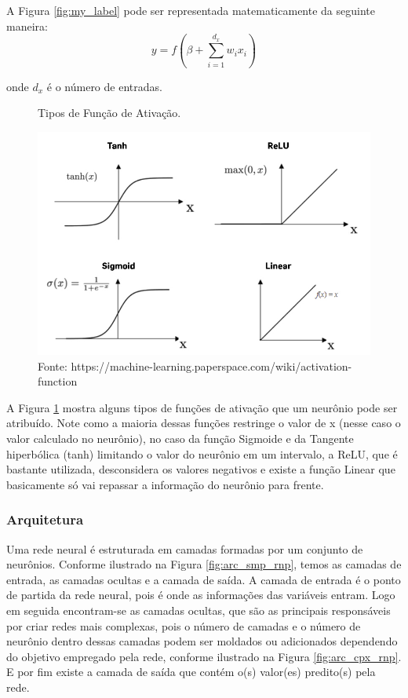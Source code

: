 A Figura \ref{fig:my_label} pode ser representada matematicamente da seguinte maneira:
\begin{equation}
    y = f (\beta + \sum_{i=1}^{d_x} w_ix_{i} ) 
    \label{neuronio}
\end{equation}
 
 onde $d_x$ é o número de entradas.


\begin{figure}[H]
    \centering
    \caption{Tipos de Função de Ativação.}
    \includegraphics[scale=0.4]{imagens/activation-functions3.jpg}
    \caption*{Fonte: https://machine-learning.paperspace.com/wiki/activation-function}
    \label{fig:func_ativac}
    
\end{figure}

A Figura \ref{fig:func_ativac} mostra alguns tipos de funções de ativação que um neurônio pode ser atribuído. Note como a maioria dessas funções restringe o valor de x (nesse caso o valor calculado no neurônio), no caso da função Sigmoide e da Tangente hiperbólica (tanh) limitando o valor do neurônio em um intervalo, a ReLU, que é bastante utilizada, desconsidera os valores negativos e existe a função Linear que basicamente só vai repassar a informação do neurônio para frente.

\vspace{1cm}



\subsubsection{Arquitetura}

Uma rede neural é estruturada em camadas formadas por um conjunto de neurônios. Conforme ilustrado na Figura \ref{fig:arc_smp_rnp}, temos as camadas de entrada, as camadas ocultas e a camada de saída. A camada de entrada é o ponto de partida da rede neural, pois é onde as informações das variáveis entram. Logo em seguida encontram-se as camadas ocultas, que são as principais responsáveis por criar redes mais complexas, pois o número de camadas e o número de neurônio dentro dessas camadas podem ser moldados ou adicionados dependendo do objetivo empregado pela rede, conforme ilustrado na Figura \ref{fig:arc_cpx_rnp}. E por fim existe a camada de saída que contém o(s) valor(es) predito(s) pela rede.

